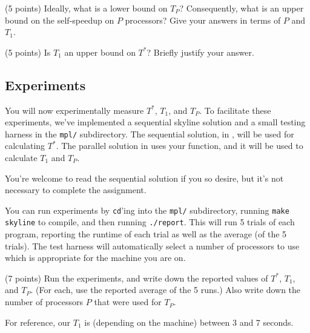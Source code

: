 \begin{task}[2]
(5 points)
Ideally, what is a lower bound on $T_P$? Consequently, what is an upper bound on
the self-speedup on $P$ processors? Give your answers in terms of $P$ and $T_1$.
\end{task}

\begin{task}[3]
(5 points)
Is $T_1$ an upper bound on $T^*$? Briefly justify your answer.
\end{task}

\subsection{Experiments}
\begin{flex}
\begin{gram}
You will now experimentally measure $T^*$, $T_1$, and $T_P$. To facilitate these
experiments, we've implemented a sequential skyline solution and a small testing
harness in the \texttt{mpl/} subdirectory. The sequential solution, in
, will be used for calculating $T^*$.
The parallel solution in  uses your 
function, and it will be used to calculate $T_1$ and $T_P$.
\end{gram}

\begin{note}
You're welcome to read the sequential solution if you so desire, but it's not
necessary to complete the assignment.
\end{note}
\end{flex}

\begin{gram}
You can run experiments by \texttt{cd}'ing into the \texttt{mpl/} subdirectory,
running \texttt{make skyline} to compile, and then running \texttt{./report}. This will
run 5 trials of each program, reporting the runtime of each trial as well as the
average (of the 5 trials). The test harness will automatically select a number
of processors to use which is appropriate for the machine you are on.
\end{gram}

\begin{flex}
\begin{task}[4]
(7 points)
Run the experiments, and write down the reported values of $T^*$, $T_1$, and
$T_P$. (For each, use the reported average of the 5 runs.) Also write down the
number of processors $P$ that were used for $T_P$.
\end{task}

\begin{note}
For reference, our $T_1$ is (depending on the machine) between 3 and 7 seconds.
\end{note}
\end{flex}

